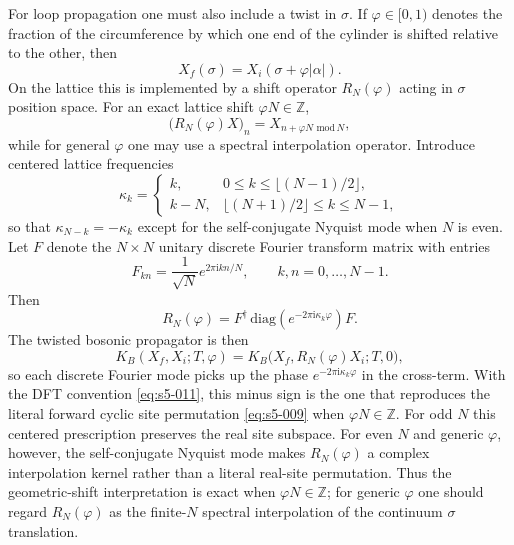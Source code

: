 \documentclass[11pt]{article}
\numberwithin{equation}{section}
\newcommand{\ZZ}{\mathbb{Z}}
\newcommand{\ii}{\mathrm{i}}
\begin{document}
For loop propagation one must also include a twist in $\sigma$. If $\varphi\in[0,1)$ denotes the fraction of the circumference by which one end of the cylinder is shifted relative to the other, then
\begin{equation}
\label{eq:s5-008}
X_f(\sigma)=X_i(\sigma+\varphi |\alpha|).
\end{equation}
On the lattice this is implemented by a shift operator $R_N(\varphi)$ acting in $\sigma$ position space. For an exact lattice shift $\varphi N\in \ZZ$,
\begin{equation}
\label{eq:s5-009}
\bigl(R_N(\varphi)X\bigr)_n = X_{n+\varphi N \,\, \mathrm{mod}\,N},
\end{equation}
while for general $\varphi$ one may use a spectral interpolation operator. Introduce centered lattice frequencies
\begin{equation}
\label{eq:s5-010}
\kappa_k=
\begin{cases}
k,& 0\le k\le \lfloor (N-1)/2\rfloor,\\
k-N,& \lfloor (N+1)/2\rfloor\le k\le N-1,
\end{cases}
\end{equation}
so that $\kappa_{N-k}=-\kappa_k$ except for the self-conjugate Nyquist mode when $N$ is even. Let $F$ denote the $N\times N$ unitary discrete Fourier transform matrix with entries
\begin{equation}
\label{eq:s5-011}
F_{kn}=\frac{1}{\sqrt N}e^{2\pi \ii kn/N},
\qquad
k,n=0,\dots,N-1.
\end{equation}
Then
\begin{equation}
\label{eq:s5-012}
R_N(\varphi)=F^\dagger \, \mathrm{diag}\!\left(e^{-2\pi \ii \kappa_k\varphi}\right) F.
\end{equation}
The twisted bosonic propagator is then
\begin{equation}
\label{eq:s5-013}
K_B(X_f,X_i;T,\varphi)=K_B\bigl(X_f,R_N(\varphi)X_i;T,0\bigr),
\end{equation}
so each discrete Fourier mode picks up the phase $e^{-2\pi \ii \kappa_k\varphi}$ in the cross-term. With the DFT convention \eqref{eq:s5-011}, this minus sign is the one that reproduces the literal forward cyclic site permutation \eqref{eq:s5-009} when $\varphi N\in\ZZ$. For odd $N$ this centered prescription preserves the real site subspace. For even $N$ and generic $\varphi$, however, the self-conjugate Nyquist mode makes $R_N(\varphi)$ a complex interpolation kernel rather than a literal real-site permutation. Thus the geometric-shift interpretation is exact when $\varphi N\in\ZZ$; for generic $\varphi$ one should regard $R_N(\varphi)$ as the finite-$N$ spectral interpolation of the continuum $\sigma$ translation.
\end{document}
